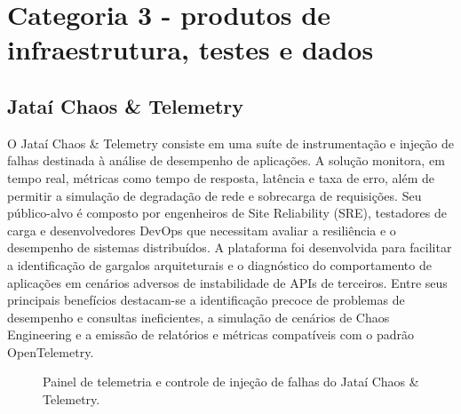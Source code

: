 \documentclass[
  12pt,
  openright,
  oneside,
  a4paper,
  brazilian
]{abntex2}
\begin{document}
\section{Categoria 3 - produtos de infraestrutura, testes e dados}
\label{sec:cat_infra_dados}

\subsection{Jataí Chaos \& Telemetry}
\label{subsec:jatai_chaos_telemetry}

O Jataí Chaos \& Telemetry consiste em uma suíte de instrumentação e injeção de falhas destinada à análise de desempenho de aplicações. A solução monitora, em tempo real, métricas como tempo de resposta, latência e taxa de erro, além de permitir a simulação de degradação de rede e sobrecarga de requisições. Seu público-alvo é composto por engenheiros de Site Reliability (SRE), testadores de carga e desenvolvedores DevOps que necessitam avaliar a resiliência e o desempenho de sistemas distribuídos. A plataforma foi desenvolvida para facilitar a identificação de gargalos arquiteturais e o diagnóstico do comportamento de aplicações em cenários adversos de instabilidade de APIs de terceiros. Entre seus principais benefícios destacam-se a identificação precoce de problemas de desempenho e consultas ineficientes, a simulação de cenários de Chaos Engineering e a emissão de relatórios e métricas compatíveis com o padrão OpenTelemetry.

\begin{figure}[htbp]
\centering
{}
\caption{Painel de telemetria e controle de injeção de falhas do Jataí Chaos \& Telemetry.}
\label{fig:jatai_chaos_telemetry}
\end{figure}
\end{document}
